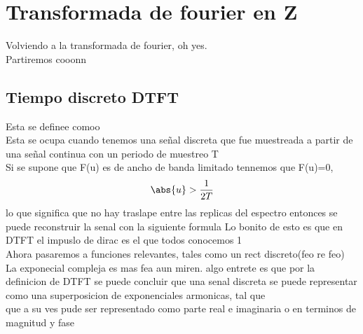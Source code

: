 \newpage 
\section{Transformada de fourier en Z}
Volviendo a la transformada de fourier, oh yes. \\
Partiremos cooonn
\subsection{Tiempo discreto DTFT}
Esta se definee comoo   \\ Esta se ocupa cuando tenemos una señal discreta que fue muestreada a partir de una señal continua con un periodo de muestreo T
\\ Si se supone que F(u) es de ancho de banda limitado tennemos que F(u)=0, $$\abs{u}>\frac{1}{2T}$$ lo que significa que no hay traslape entre las replicas del espectro entonces se puede reconstruir la senal con la siguiente formula 
Lo bonito de esto es que en DTFT el impuslo de dirac es el que todos conocemos 1 \\ Ahora pasaremos a funciones relevantes, tales como un rect discreto(feo re feo)
La exponecial compleja es mas fea aun miren.
 algo entrete es que por la definicion de DTFT se puede concluir que una senal discreta se puede representar como una superposicion de exponenciales armonicas, tal que
 \\ que a su ves pude ser representado como parte real e imaginaria o en terminos de magnitud y fase
\\
\\
\\
